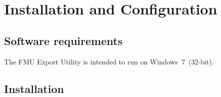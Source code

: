 \chapter{Installation and Configuration}

\section{Software requirements}

The \fmipp \matlab FMU Export Utility is intended to run on Windows~7~(32-bit).


\section{Installation}
\label{sec:install}

